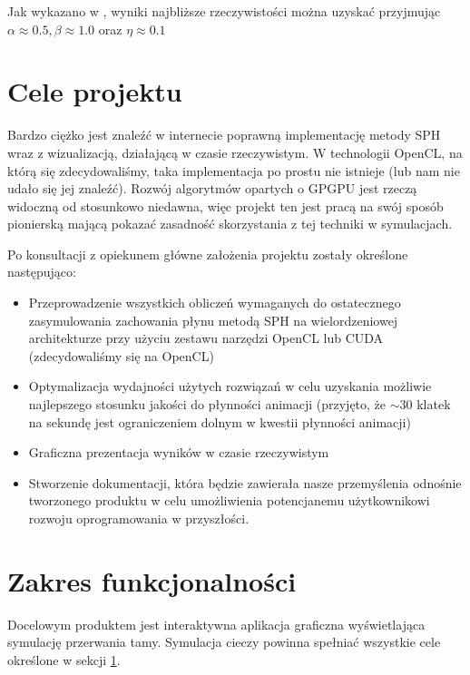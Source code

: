 \documentclass[polish, 12pt]{aghthesis}
\begin{document}
			Jak wykazano w \cite{Lombardi}, wyniki najbliższe rzeczywistości można uzyskać przyjmując $\alpha \approx 0.5, \beta \approx 1.0$ oraz $\eta \approx 0.1$

\section{Cele projektu}
\label{sec:cele}

Bardzo ciężko jest znaleźć w internecie poprawną implementację metody SPH wraz z wizualizacją, działającą w czasie rzeczywistym. W technologii OpenCL, na którą się zdecydowaliśmy, taka implementacja po prostu nie istnieje (lub nam nie udało się jej znaleźć). Rozwój algorytmów opartych o GPGPU jest rzeczą widoczną od stosunkowo niedawna, więc projekt ten jest pracą na swój sposób pionierską mającą pokazać zasadność skorzystania z tej techniki w symulacjach.
		
	Po konsultacji z opiekunem główne założenia projektu zostały określone następująco:
	
	\begin{itemize}
	
		\item Przeprowadzenie wszystkich obliczeń wymaganych do ostatecznego zasymulowania zachowania płynu metodą SPH na wielordzeniowej architekturze przy użyciu zestawu narzędzi OpenCL lub CUDA (zdecydowaliśmy się na OpenCL)
				
		\item Optymalizacja wydajności użytych rozwiązań w celu uzyskania możliwie najlepszego stosunku jakości do płynności animacji (przyjęto, że $\sim 30$ klatek na sekundę jest ograniczeniem dolnym w kwestii płynności animacji)
		
		\item Graficzna prezentacja wyników w czasie rzeczywistym
	
		\item Stworzenie dokumentacji, która będzie zawierała nasze przemyślenia odnośnie tworzonego produktu w celu umożliwienia potencjanemu użytkownikowi rozwoju oprogramowania w przyszłości.
		
	\end{itemize}
	
\section{Zakres funkcjonalności}
	
	Docelowym produktem jest interaktywna aplikacja graficzna wyświetlająca symulację przerwania tamy. Symulacja cieczy powinna spełniać wszystkie cele określone w sekcji \ref{sec:cele}.
	
\end{document}
